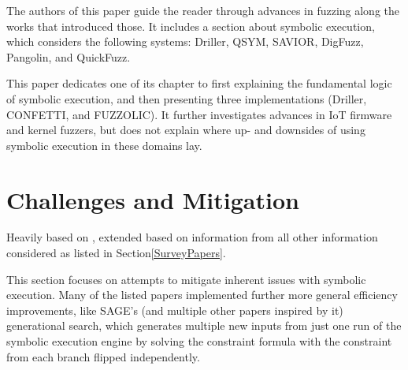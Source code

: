 \documentclass{article}
\begin{document}
\begin{multicols}{2}
    The authors of this paper guide the reader through advances in fuzzing along the works that introduced those. It includes a section about symbolic execution, which considers the following systems: Driller\cite{Driller}, QSYM\cite{QSYM}, SAVIOR\cite{SAVIOR}, DigFuzz\cite{DigFuzz}, Pangolin\cite{Pangolin}, and QuickFuzz\cite{QuickFuzz}.

    This paper dedicates one of its chapter to first explaining the fundamental logic of symbolic execution, and then presenting three implementations (Driller\cite{Driller}, CONFETTI\cite{CONFETTI}, and FUZZOLIC\cite{FUZZOLIC}). It further investigates advances in IoT firmware and kernel fuzzers, but does not explain where up- and downsides of using symbolic execution in these domains lay.

    \section{Challenges and Mitigation}
    \label{Results}
    Heavily based on \cite{ReviewThreeDecades, PreliminaryAssessment}, extended based on information from all other information considered as listed in Section\ref{SurveyPapers}.

    This section focuses on attempts to mitigate inherent issues with symbolic execution. Many of the listed papers implemented further more general efficiency improvements, like SAGE's\cite{SAGE} (and multiple other papers inspired by it) generational search, which generates multiple new inputs from just one run of the symbolic execution engine by solving the constraint formula with the constraint from each branch flipped independently.


\end{multicols}
\end{document}
